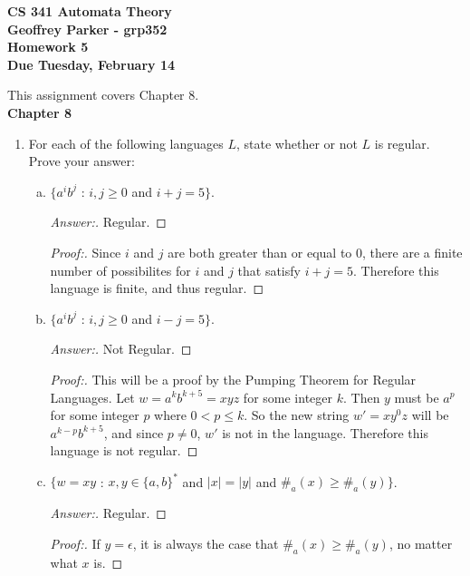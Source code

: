 \documentclass[10pt]{article}
\newcommand{\card}[1]{\left| #1 \right|}
\begin{document}
\begin{flushleft}
\textbf{\noindent
CS 341 Automata Theory \\
Geoffrey Parker - grp352 \\
Homework 5 \\
Due Tuesday, February 14}\\
\end{flushleft}
\noindent
This assignment covers Chapter 8. \\

\noindent
\textbf{Chapter 8}
\begin{enumerate}[1)]

\item
For each of the following languages $L$, state whether or not $L$ is regular.  Prove your answer:
\begin{enumerate}[a)]
\item
$\{a^ib^j$ : $i, j \geq 0$ and $i + j = 5\}$.
\begin{proof}[Answer:]
Regular.
\end{proof}
\begin{proof}[Proof:]
Since $i$ and $j$ are both greater than or equal to 0, there are a finite number of possibilites for $i$ and $j$ that satisfy $i + j = 5$.  Therefore this language is finite, and thus regular.
\end{proof}

\item
$\{a^ib^j$ : $i, j \geq 0$ and $i - j = 5\}$.
\begin{proof}[Answer:]
Not Regular.
\end{proof}
\begin{proof}[Proof:]
This will be a proof by the Pumping Theorem for Regular Languages.  Let $w = a^kb^{k+5} = xyz$ for some integer $k$.  Then $y$ must be $a^p$ for some integer $p$ where $0 < p \leq k$.  So the new string $w' = xy^0z$ will be $a^{k-p}b^{k+5}$, and since $p \neq 0$, $w'$ is not in the language.  Therefore this language is not regular.
\end{proof}

\item
$\{w = xy$ : $x, y \in \{a, b\}^*$ and $\card{x} = \card{y}$ and $\#_a(x) \geq \#_a(y)\}$.
\begin{proof}[Answer:]
Regular.
\end{proof}
\begin{proof}[Proof:]
If $y = \epsilon$, it is always the case that $\#_a(x) \geq \#_a(y)$, no matter what $x$ is.
\end{proof}


\end{enumerate}
\end{enumerate}
\end{document}
